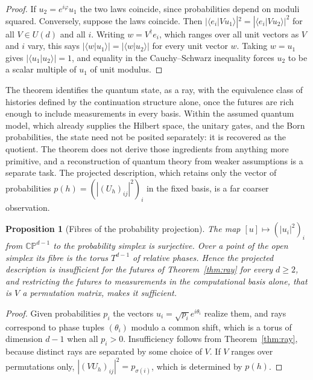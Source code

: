\documentclass[11pt,oneside]{book}
\newtheorem{proposition}[theorem]{Proposition}
\theoremstyle{definition}
\theoremstyle{remark}
\begin{document}
\begin{proof}
If $u_2=e^{i\varphi}u_1$ the two laws coincide, since probabilities depend on moduli squared. Conversely, suppose the laws coincide. Then $|\langle e_i|Vu_1\rangle|^2=|\langle e_i|Vu_2\rangle|^2$ for all $V\in U(d)$ and all $i$. Writing $w=V^{\dagger}e_i$, which ranges over all unit vectors as $V$ and $i$ vary, this says $|\langle w|u_1\rangle|=|\langle w|u_2\rangle|$ for every unit vector $w$. Taking $w=u_1$ gives $|\langle u_1|u_2\rangle|=1$, and equality in the Cauchy--Schwarz inequality forces $u_2$ to be a scalar multiple of $u_1$ of unit modulus.
\end{proof}

The theorem identifies the quantum state, as a ray, with the equivalence class of histories defined by the continuation structure alone, once the futures are rich enough to include measurements in every basis. Within the assumed quantum model, which already supplies the Hilbert space, the unitary gates, and the Born probabilities, the state need not be posited separately: it is recovered as the quotient. The theorem does not derive those ingredients from anything more primitive, and a reconstruction of quantum theory from weaker assumptions is a separate task. The projected description, which retains only the vector of probabilities $p(h)=(|(U_h)_{ij}|^2)_i$ in the fixed basis, is a far coarser observation.

\begin{proposition}[Fibres of the probability projection]\label{prop:fibre}
The map $[u]\mapsto(|u_i|^2)_i$ from $\mathbb{CP}^{d-1}$ to the probability simplex is surjective. Over a point of the open simplex its fibre is the torus $T^{d-1}$ of relative phases. Hence the projected description is insufficient for the futures of Theorem~\ref{thm:ray} for every $d\ge2$, and restricting the futures to measurements in the computational basis alone, that is $V$ a permutation matrix, makes it sufficient.
\end{proposition}

\begin{proof}
Given probabilities $p_i$ the vectors $u_i=\sqrt{p_i}e^{i\theta_i}$ realize them, and rays correspond to phase tuples $(\theta_i)$ modulo a common shift, which is a torus of dimension $d-1$ when all $p_i>0$. Insufficiency follows from Theorem~\ref{thm:ray}, because distinct rays are separated by some choice of $V$. If $V$ ranges over permutations only, $|(VU_h)_{ij}|^2=p_{\sigma(i)}$, which is determined by $p(h)$.
\end{proof}
\end{document}

